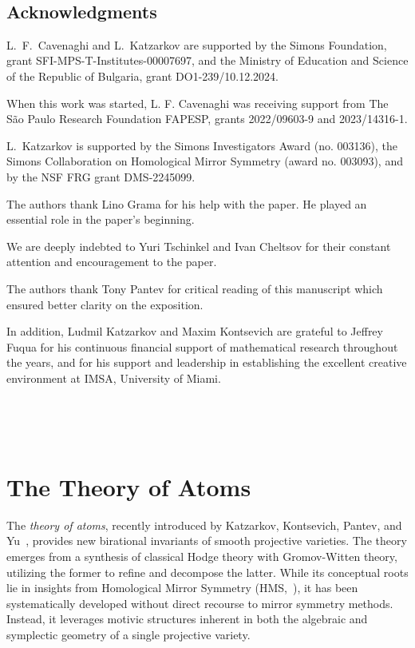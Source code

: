 \documentclass[12pt,a4paper]{amsart}
\theoremstyle{definition}
\theoremstyle{remark}
\begin{document}
\ 

\subsection*{Acknowledgments}
L.~F.~Cavenaghi and L.~Katzarkov are supported by the Simons Foundation, grant SFI-MPS-T-Institutes-00007697, and the Ministry of Education and Science of the Republic of Bulgaria, grant DO1-239/10.12.2024. 

When this work was started, L. F. Cavenaghi was receiving support from The São Paulo Research Foundation FAPESP, grants 2022/09603-9 and 2023/14316-1. 


L.~Katzarkov is supported by the Simons Investigators Award (no. 003136), the Simons Collaboration on Homological Mirror Symmetry (award no. 003093), and by the NSF FRG grant DMS-2245099.

The authors thank Lino Grama for his help with the paper. He played an essential role in the paper's beginning.

We are deeply indebted to Yuri Tschinkel and Ivan Cheltsov for their constant attention and encouragement to the paper.

The authors thank Tony Pantev for critical reading of this manuscript which ensured better clarity on the exposition.

In addition, Ludmil Katzarkov and Maxim Kontsevich are grateful to Jeffrey Fuqua for his continuous financial support of mathematical research throughout the years, and for his support and leadership in establishing the excellent creative environment at IMSA, University of Miami.

\ 


\ 



\section{The Theory of Atoms}
\label{sec:theory-of-atoms}

The \emph{theory of atoms}, recently introduced by Katzarkov, Kontsevich, Pantev, and Yu~\cite{katzarkovpantevyu}, provides new birational invariants of smooth projective varieties. The theory emerges from a synthesis of classical Hodge theory with Gromov-Witten theory, utilizing the former to refine and decompose the latter. While its conceptual roots lie in insights from Homological Mirror Symmetry (HMS,~\cite{Kontsevich-HMS}), it has been systematically developed without direct recourse to mirror symmetry methods. Instead, it leverages motivic structures inherent in both the algebraic and symplectic geometry of a single projective variety.
\end{document}

